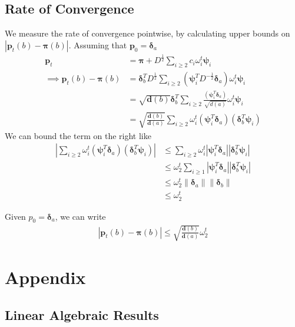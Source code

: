 \documentclass{math}
\renewcommand{\vec}[1]{\boldsymbol{#1}}
\begin{document}
\subsection{Rate of Convergence}

We measure the rate of convergence pointwise, by calculating upper bounds on $|\vec{p}_t(b) - \vec{\pi}(b)|$.
Assuming that $\vec{p}_0 = \vec{\delta}_a$
\begin{align*}
    \vec{p}_t &= \vec{\pi} + D^{\frac{1}{2}} \sum_{i \geq 2} c_i \omega_i^t \vec{\psi}_i \\
    \implies \vec{p}_t(b) - \vec{\pi}(b) &= \vec{\delta}_b^T D^{\frac{1}{2}} \sum_{i \geq 2}\left(\vec{\psi}_i^T D^{-\frac{1}{2}} \vec{\delta}_a\right) \omega_i^t \vec{\psi}_i \\
    &= \sqrt{\vec{d}(b)} \vec{\delta}_b^T \sum_{i \geq 2}\frac{(\vec{\psi}_i^T \vec{\delta}_a)}{\sqrt{d(a)}} \omega_i^t \vec{\psi}_i \\
    &= \sqrt{\frac{\vec{d}(b)}{\vec{d}(a)}} \sum_{i \geq 2}\omega_i^t(\vec{\psi}_i^T \vec{\delta}_a) (\vec{\delta}_b^T \vec{\psi}_i)
\end{align*}
We can bound the term on the right like
\begin{align*}
    \left| \sum_{i \geq 2}\omega_i^t(\vec{\psi}_i^T \vec{\delta}_a) (\vec{\delta}_b^T \vec{\psi}_i) \right| &\leq \sum_{i \geq 2} \omega_i^t |\vec{\psi}_i^T \vec{\delta}_a| |\vec{\delta}_b^T \vec{\psi}_i| \\
    &\leq \omega_2^t \sum_{i \geq 1} |\vec{\psi}_i^T \vec{\delta}_a| |\vec{\delta}_b^T \vec{\psi}_i| \\
    &\leq \omega_2^t \lVert \vec{\delta}_a \rVert \lVert \vec{\delta}_b \rVert \\
    &\leq \omega_2^t
\end{align*}

\begin{theorem}
    Given $p_0 = \vec{\delta}_a$, we can write
    \begin{align*}
        |\vec{p}_t(b) - \vec{\pi}(b)| \leq \sqrt{\frac{\vec{d}(b)}{\vec{d}(a)}} \omega_2^t
    \end{align*}
\end{theorem}

\section{Appendix}

\subsection{Linear Algebraic Results}
\end{document}
